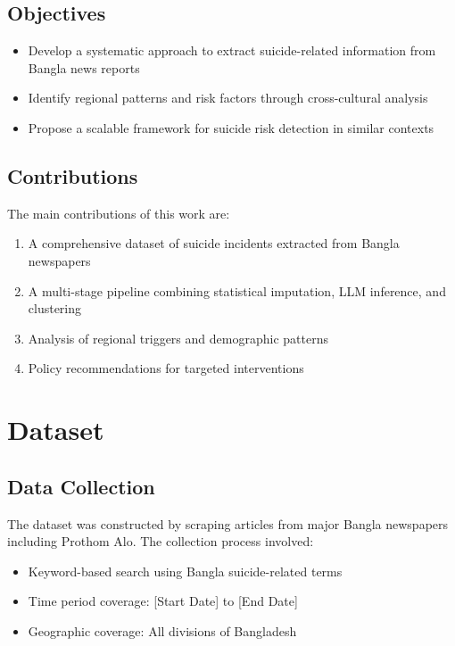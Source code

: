 \documentclass[12pt,a4paper]{article}
\begin{document}
\subsection{Objectives}
\begin{itemize}
    \item Develop a systematic approach to extract suicide-related information from Bangla news reports
    \item Identify regional patterns and risk factors through cross-cultural analysis
    \item Propose a scalable framework for suicide risk detection in similar contexts
\end{itemize}

\subsection{Contributions}
The main contributions of this work are:
\begin{enumerate}
    \item A comprehensive dataset of suicide incidents extracted from Bangla newspapers
    \item A multi-stage pipeline combining statistical imputation, LLM inference, and clustering
    \item Analysis of regional triggers and demographic patterns
    \item Policy recommendations for targeted interventions
\end{enumerate}

\section{Dataset}

\subsection{Data Collection}
The dataset was constructed by scraping articles from major Bangla newspapers including Prothom Alo. The collection process involved:

\begin{itemize}
    \item Keyword-based search using Bangla suicide-related terms
    \item Time period coverage: [Start Date] to [End Date]
    \item Geographic coverage: All divisions of Bangladesh
\end{itemize}
\end{document}
